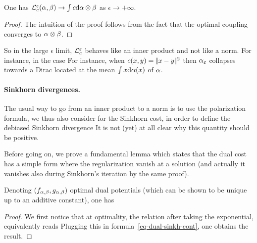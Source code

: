 \begin{prop}
	One has $\mathcal{L}_c^\varepsilon(\alpha,\beta) \rightarrow \int c \mathrm{d}\alpha \otimes \beta$ as $\epsilon \rightarrow +\infty$.
\end{prop}
\begin{proof}	
	The intuition of the proof follows from the fact that the optimal coupling converges to $\alpha \otimes \beta$. 
\end{proof}

So in the large $\epsilon$ limit, $\mathcal{L}_c^\varepsilon$ behaves like an inner product and not like a norm. For instance, in the case 
For instance, when $c(x,y)=|\!| x-y |\!|^2$ then $\alpha_\varepsilon$ collapses towards a Dirac located at the mean $\int x \mathrm{d}\alpha(x)$ of $\alpha$.

\paragraph{Sinkhorn divergences.}

The usual way to go from an inner product to a norm is to use the polarization formula, we thus also consider for the Sinkhorn cost, in order to define the debiased Sinkhorn divergence
It is not (yet) at all clear why this quantity should be positive. 

Before going on, we prove a fundamental lemma which states that the dual cost has a simple form where the regularization vanish at a solution (and actually it vanishes also during Sinkhorn's iteration by the same proof).

\begin{lem}
	Denoting $(f_{\alpha,\beta},g_{\alpha,\beta})$ optimal dual potentials (which can be shown to be unique up to an additive constant), one has
\end{lem}
\begin{proof}
	We first notice that at optimality, the relation 
	after taking the exponential, equivalently reads
	Plugging this in formula~\eqref{eq-dual-sinkh-cont}, one obtains the result.
\end{proof}


